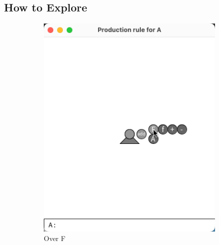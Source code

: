 \documentclass[12pt,twoside]{reedthesis}
\begin{document}
\subsection{How to Explore}
	\begin{figure}[H]
	\centering
	\begin{subfigure}{0.25\textwidth}
		\centering
		\includegraphics[trim={5cm 6cm 2cm 4cm}, clip, width=\textwidth]{Images/HowToExplore1A}
		\caption{Over F}
		\label {HowToExplore1A}
	\end{subfigure}%
	\begin{subfigure}{0.25\textwidth}
		\centering

\end{subfigure}
\end{figure}
\end{document}
